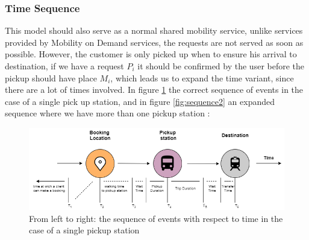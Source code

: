 \documentclass{article}
\begin{document}


\subsubsection{Time Sequence}
\label{subsec:timeseq}
This model should also serve as a normal shared mobility service, unlike services provided by Mobility on Demand services, the requests are not served as soon as possible. However, the customer is only picked up when to ensure his arrival to destination, 
if we have a request $P_i$  it should be confirmed by the user before the pickup should have place $M_i$, which leads us to expand the time variant, since there are a lot of times involved. In figure \ref{fig:sequence} the correct sequence of events in the case of a single pick up station, and in figure \ref{fig:sequence2} an expanded sequence where we have more than one pickup station :

\begin{figure}[H]
    \centering 
  \includegraphics[width=\linewidth]{pictures/Time_sequence}
  \caption{From left to right: the sequence of events with respect to time in the case of a single pickup station}
\label{fig:sequence}
\end{figure}
\end{document}
